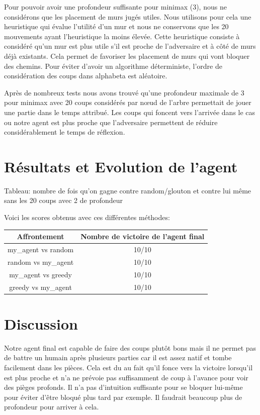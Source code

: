 \documentclass[12pt]{article}
\begin{document}
Pour pouvoir avoir une profondeur suffisante pour minimax (3), nous ne considérons que les placement de murs jugés utiles. Nous utilisons pour cela une heuristique qui évalue l'utilité d'un mur et nous ne conservons que les 20 mouvements ayant l'heuristique la moins élevée. Cette heuristique consiste à considéré qu'un mur est plus utile s'il est proche de l'adversaire et à côté de murs déjà existants. Cela permet de favoriser les placement de murs qui vont bloquer des chemins. Pour éviter d'avoir un algorithme déterministe, l'ordre de considération des coups dans alphabeta est aléatoire. 

Après de nombreux tests nous avons trouvé qu'une profondeur maximale de 3 pour minimax avec 20 coups considérés par nœud de l'arbre permettait de jouer une partie dans le temps attribué. Les coups qui foncent vers l'arrivée dans le cas ou notre agent est plus proche que l'adversaire permettent de réduire considérablement le temps de réflexion. 

\section*{Résultats et Evolution de l'agent}

Tableau: nombre de fois qu'on gagne contre random/glouton et contre lui même sans les 20 coups avec 2 de profondeur

Voici les scores obtenus avec ces différentes méthodes:
\begin{center}
  \begin{tabular}{ |c|c| }
    \hline
    Affrontement & Nombre de victoire de l'agent final \\\hline\hline
    my\_agent vs random & 10/10 \\\hline
    random vs my\_agent & 10/10 \\\hline
    my\_agent vs greedy & 10/10 \\\hline
    greedy vs my\_agent & 10/10 \\\hline

  \end{tabular}
\end{center}


\section*{Discussion}

Notre agent final est capable de faire des coups plutôt bons mais il ne permet pas de battre un humain après plusieurs parties car il est assez natif et tombe facilement dans les pièces. Cela est du au fait qu'il fonce vers la victoire lorsqu'il est plus proche et n'a ne prévoie pas suffisamment de coup à l'avance pour voir des pièges profonds. Il n'a pas d'intuition suffisante pour se bloquer lui-même pour éviter d'être bloqué plus tard par exemple. Il faudrait beaucoup plus de profondeur pour arriver à cela. 
\end{document}

